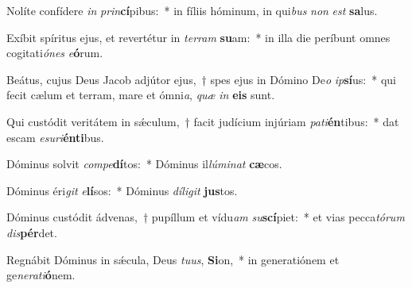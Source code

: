 \item Nolíte confídere \textit{in} \textit{prin}\textbf{cí}pibus:~* in fíliis hóminum, in qui\textit{bus} \textit{non} \textit{est} \textbf{sa}lus.
\item Exíbit spíritus ejus, et revertétur in \textit{ter}\textit{ram} \textbf{su}am:~* in illa die períbunt omnes cogitati\textit{ó}\textit{nes} \textit{e}\textbf{ó}rum.
\item Beátus, cujus Deus Jacob adjútor ejus,~† spes ejus in Dómino De\textit{o} \textit{ip}\textbf{sí}us:~* qui fecit cælum et terram, mare et ómni\textit{a}, \textit{quæ} \textit{in} \textbf{e}\textbf{is} sunt.
\item Qui custódit veritátem in sǽculum,~† facit judícium injúriam \textit{pa}\textit{ti}\textbf{én}tibus:~* dat escam \textit{e}\textit{su}\textit{ri}\textbf{én}\textbf{ti}bus.
\item Dóminus solvit \textit{com}\textit{pe}\textbf{dí}tos:~* Dóminus il\textit{lú}\textit{mi}\textit{nat} \textbf{cæ}cos.
\item Dóminus éri\textit{git} \textit{e}\textbf{lí}sos:~* Dóminus \textit{dí}\textit{li}\textit{git} \textbf{jus}tos.
\item Dóminus custódit ádvenas,~† pupíllum et vídu\textit{am} \textit{su}\textbf{scí}piet:~* et vias pecca\textit{tó}\textit{rum} \textit{dis}\textbf{pér}det.
\item Regnábit Dóminus in sǽcula, Deus \textit{tu}\textit{us}, \textbf{Si}on,~* in generatiónem et ge\textit{ne}\textit{ra}\textit{ti}\textbf{ó}nem.
